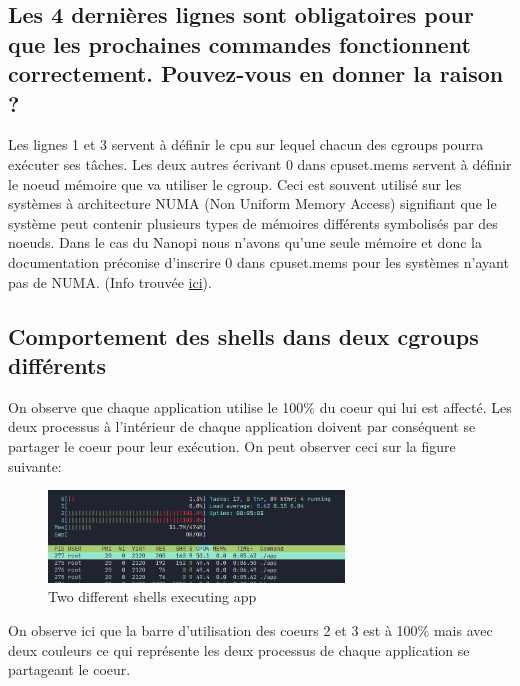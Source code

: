 \documentclass{ReportTemplate}
\begin{document}
\subsection{Les 4 dernières lignes sont obligatoires pour que les prochaines commandes fonctionnent correctement. Pouvez-vous en donner la raison ?}
Les lignes 1 et 3 servent à définir le cpu sur lequel chacun des cgroups pourra
exécuter ses tâches. Les deux autres écrivant 0 dans cpuset.mems servent à
définir le noeud mémoire que va utiliser le cgroup. Ceci est souvent utilisé sur
les systèmes à architecture NUMA (Non Uniform Memory Access) signifiant que le
système peut contenir plusieurs types de mémoires différents symbolisés par des
noeuds. Dans le cas du Nanopi nous n'avons qu'une seule mémoire et donc la
documentation préconise d'inscrire 0 dans cpuset.mems pour les systèmes n'ayant
pas de NUMA. (Info trouvée \href{https://docs.oracle.com/cd/E37670_01/E37355/html/ol_cpuset_cgroups.html#:~:text=mems%20changes.,the%20node%20list%20where%20possible.}{ici}). 
\subsection{Comportement des shells dans deux cgroups différents}
On observe que chaque application utilise le 100\% du coeur qui lui est affecté.
Les deux processus à l'intérieur de chaque application doivent par conséquent se
partager le coeur pour leur exécution. On peut observer ceci sur la figure
suivante:
\begin{figure}[H]
    \centering
    \includegraphics[width=0.7\textwidth]{imageSources/LowHigh_Groups.png}
    \caption{Two different shells executing app}
    \label{fig:LowHighGroup}
\end{figure}
On observe ici que la barre d'utilisation des coeurs 2 et 3 est à 100\% mais
avec deux couleurs ce qui représente les deux processus de chaque application se
partageant le coeur.
\end{document}
